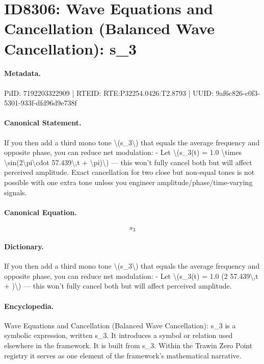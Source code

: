 \section*{ID8306: Wave Equations and Cancellation (Balanced Wave Cancellation): s\_3}
\paragraph{Metadata.}
PiID: 7192203322909 | RTEID: RTE:P32254.0426:T2.8793 | UUID: 9af6c826-c0f3-5301-933f-dfd96d9e738f

\paragraph{Canonical Statement.}
If you then add a third mono tone \textbackslash{}(s\_3\textbackslash{}) that equals the average frequency and opposite phase, you can reduce net modulation: - Let \textbackslash{}(s\_3(t) = 1.0 \textbackslash{}times \textbackslash{}sin(2\textbackslash{}pi\textbackslash{}cdot 57.439\textbackslash{},t + \textbackslash{}pi)\textbackslash{}) — this won’t fully cancel both but will affect perceived amplitude. Exact cancellation for two close but non-equal tones is not possible with one extra tone unless you engineer amplitude/phase/time-varying signals.

\paragraph{Canonical Equation.}
\[
s_3
\]

\paragraph{Dictionary.}
If you then add a third mono tone \textbackslash{}(s\_3\textbackslash{}) that equals the average frequency and opposite phase, you can reduce net modulation: - Let \textbackslash{}(s\_3(t) = 1.0 (2 57.439\textbackslash{},t + )\textbackslash{}) — this won’t fully cancel both but will affect perceived amplitude.

\paragraph{Encyclopedia.}
Wave Equations and Cancellation (Balanced Wave Cancellation): s\_3 is a symbolic expression, written s\_3. It introduces a symbol or relation used elsewhere in the framework. It is built from s\_3. Within the Trawin Zero Point registry it serves as one element of the framework's mathematical narrative.
